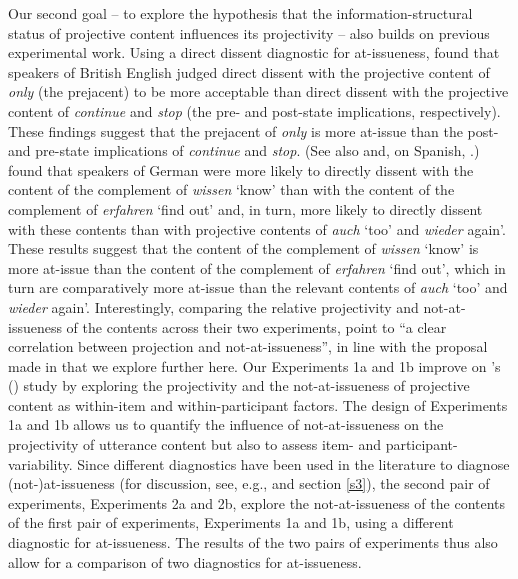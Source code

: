 \documentclass[11pt,fleqn]{article}
\newcommand{\6}{\mbox{$[\hspace*{-.6mm}[$}}
\newcommand{\9}{\mbox{$]\hspace*{-.6mm}]$}}
\newcommand{\citetpos}[1]{\citeauthor{#1}'s (\citeyear{#1})}
\begin{document}
Our second goal -- to explore the hypothesis that the information-structural status of projective content influences its projectivity -- also builds on previous experimental work. 
 Using a direct dissent diagnostic for at-issueness, \citet{amaral-etal11} found that speakers of British English judged direct dissent with the projective content of {\em only} (the prejacent) to be more acceptable than direct dissent with the projective content of {\em continue} and {\em stop} (the pre- and post-state implications, respectively). These findings suggest that the prejacent of {\em only} is more at-issue than the post- and pre-state implications of {\em continue} and {\em stop}. (See also \citealt{cummins-etal2012} and, on Spanish, \citealt{amaral-cummins2015}.) \citet{xue-onea11} found that speakers of German were more likely to directly dissent with the content of the complement of {\em wissen} `know' than with the content of the complement of {\em erfahren} `find out' and, in turn, more likely to directly dissent with these contents than with projective contents of {\em auch} `too' and {\em wieder} again'. These results suggest that the content of the complement of {\em wissen} `know' is more at-issue than the content of the complement of {\em erfahren} `find out', which in turn are comparatively more at-issue than the relevant contents of {\em auch} `too' and {\em wieder} again'. Interestingly, comparing the relative projectivity and not-at-issueness 
of the contents across their two experiments, \citet[180]{xue-onea11} point to ``a clear correlation between projection and not-at-issueness'', in line with the proposal made in \citealt{brst-salt10} that we explore further here. Our Experiments 1a and 1b improve on \citetpos{xue-onea11} study by exploring the projectivity and the not-at-issueness of projective content as within-item and within-participant factors. The design of Experiments 1a and 1b allows us to quantify the influence of not-at-issueness on the projectivity of utterance content but also to assess item- and participant-variability. Since different diagnostics have been used in the literature to diagnose (not-)at-issueness (for discussion, see, e.g., \citealt{tonhauser-sula6} and section \ref{s3}), the second pair of experiments, Experiments 2a and 2b, explore the not-at-issueness of the contents of the first pair of experiments, Experiments 1a and 1b, using a different diagnostic for at-issueness. The results of the two pairs of experiments thus also allow for a comparison of two diagnostics for at-issueness.
\end{document}
